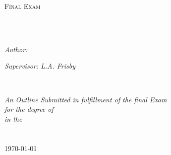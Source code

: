 \documentclass[11pt,english,singlespacing,headsepline,]{MastersDoctoralThesis}
\author{Bowen \textsc{Durrett}} %
\begin{document}
\frontmatter
\pagestyle{plain}

\begin{titlepage}
\begin{center}
\vspace*{.06\textheight}
{\scshape\LARGE \univname\par}\vspace{1.5cm} %
\textsc{\Large Final Exam}\\[0.5cm] %
\HRule \\[0.4cm] %
{\huge \bfseries \ttitle\par}\vspace{0.4cm} %
\HRule \\[1.5cm] %
\begin{minipage}[t]{0.4\textwidth}
\begin{flushleft} \large
\emph{Author:}\\
\href{http://www.blinn.edu/current.html}{\authorname}
\end{flushleft}
\end{minipage}
\begin{minipage}[t]{0.4\textwidth}
\begin{flushright} \large
\emph{Supervisor: L.A. Frisby} \\
\href{https://www.linkedin.com/in/frisbyohfrisby
}{\supname} %
\end{flushright}
\end{minipage}\\[3cm]
\vfill

\large \textit{An Outline Submitted in fulfillment of the final Exam \\ for the degree of \degreename}\\[0.3cm] %
\textit{in the}\\[0.4cm]
\groupname\\\deptname\\[2cm] %
\vfill
{\large \today}\\[4cm] %
 
\vfill
\end{center}
\end{titlepage}

\end{document}
